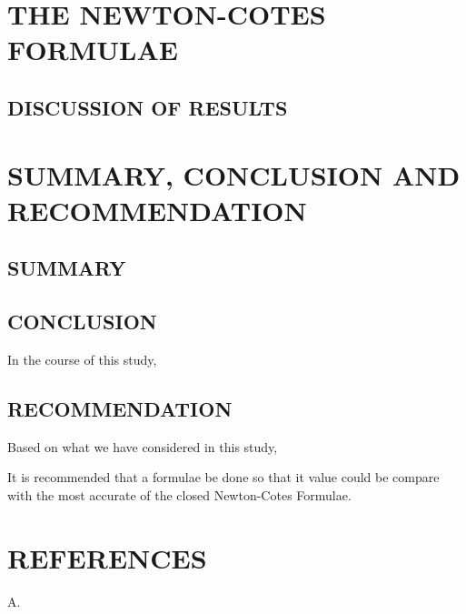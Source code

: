 \documentclass[12pt]{report}
\newcommand{\NI}{\noindent}
\begin{document}
	
	\chapter{THE NEWTON-COTES FORMULAE}
	\section{DISCUSSION OF RESULTS}
	
	
	\chapter{SUMMARY, CONCLUSION AND RECOMMENDATION}
	\section{SUMMARY}

	
	\section{CONCLUSION} 
	In the course of this study, 
	
	\section{RECOMMENDATION}
	Based on what we have considered in this study, 
	
	\NI It is recommended that a formulae be done so that it value could be compare with the most accurate of the closed Newton-Cotes Formulae.
	

		\chapter*{REFERENCES}
	\begin{description}
		\item A.
	\end{description}
\end{document}
